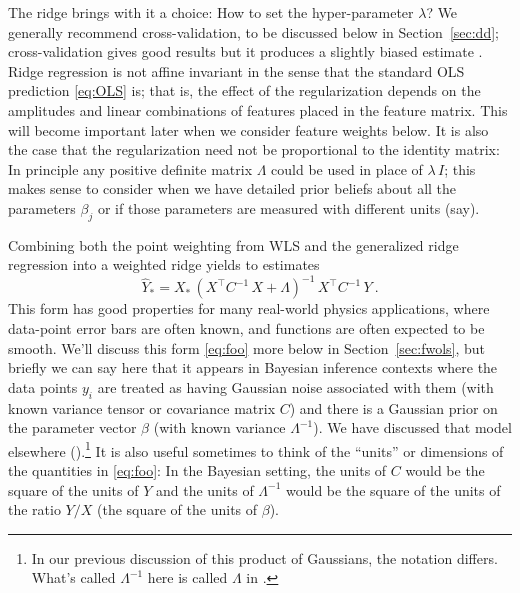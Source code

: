 \documentclass[12pt,letterpaper]{article}
\newcommand{\sectionname}{Section}
\begin{document}
The ridge brings with it a choice: How to set the hyper-parameter $\lambda$?
We generally recommend cross-validation, to be discussed below in \sectionname~\ref{sec:dd}; cross-validation gives good results but it produces a slightly biased estimate \citep{cv-bias}.
Ridge regression is not affine invariant in the sense that the standard OLS prediction \eqref{eq:OLS} is; that is, the effect of the regularization depends on the amplitudes and linear combinations of features placed in the feature matrix.
This will become important later when we consider feature weights below.
It is also the case that the regularization need not be proportional to the identity matrix: In principle any positive definite matrix $\Lambda$ could be used in place of $\lambda\,I$; this makes sense to consider when we have detailed prior beliefs about all the parameters $\beta_j$ or if those parameters are measured with different units (say).

Combining both the point weighting from WLS and the generalized ridge regression into a weighted ridge yields to estimates
\begin{equation}\label{eq:foo}
    \hat{Y}_\ast = X_\ast\,(X^\top C^{-1}\,X + \Lambda)^{-1}\,X^\top C^{-1}\,Y
    ~.
\end{equation}
This form has good properties for many real-world physics applications, where data-point error bars are often known, and functions are often expected to be smooth.
We'll discuss this form \eqref{eq:foo} more below in \sectionname~\ref{sec:fwols},
but briefly we can say here that it appears in Bayesian inference contexts where the data points $y_i$ are treated as having Gaussian noise associated with them (with known variance tensor or covariance matrix $C$) and there is a Gaussian prior on the parameter vector $\beta$ (with known variance $\Lambda^{-1}$).
We have discussed that model elsewhere (\citealt{products}).\footnote{In our previous discussion of this product of Gaussians, the notation differs. What's called $\Lambda^{-1}$ here is called $\Lambda$ in \citet{products}.}
It is also useful sometimes to think of the ``units'' or dimensions of the quantities in \eqref{eq:foo}: In the Bayesian setting, the units of $C$ would be the square of the units of $Y$ and the units of $\Lambda^{-1}$ would be the square of the units of the ratio $Y/X$ (the square of the units of $\beta$).
\end{document}
